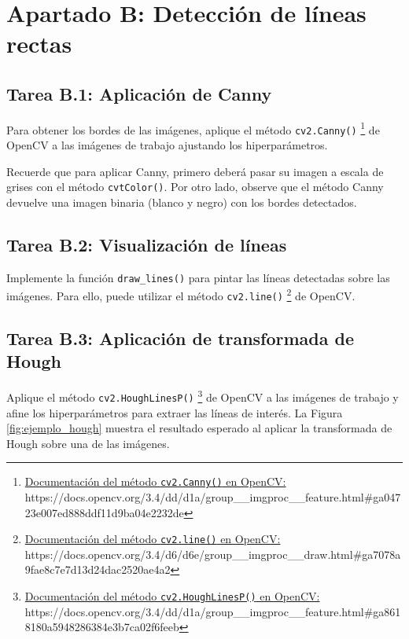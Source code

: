 \chapter{Apartado B: \textbf{Detección de líneas rectas}}
\label{chapter:tarea_b}

\section*{Tarea B.1: Aplicación de Canny}
{}

Para obtener los bordes de las imágenes, aplique el método \texttt{cv2.Canny()} \footnote{ \href{https://docs.opencv.org/3.4/dd/d1a/group\_\_imgproc\_\_feature.html\#ga04723e007ed888ddf11d9ba04e2232de}{Documentación del método \texttt{cv2.Canny()} en OpenCV:} \\{https://docs.opencv.org/3.4/dd/d1a/group\_\_imgproc\_\_feature.html\#ga04723e007ed888ddf11d9ba04e2232de}} de OpenCV a las imágenes de trabajo ajustando los hiperparámetros.

Recuerde que para aplicar Canny, primero deberá pasar su imagen a escala de grises con el método \texttt{cvtColor()}. Por otro lado, observe que el método Canny devuelve una imagen binaria (blanco y negro) con los bordes detectados.


\section*{Tarea B.2: Visualización de líneas}
{}

Implemente la función \texttt{draw\_lines()} para pintar las líneas detectadas sobre las imágenes. Para ello, puede utilizar el método \texttt{cv2.line()} \footnote{ \href{https://docs.opencv.org/3.4/d6/d6e/group\_\_imgproc\_\_draw.html\#ga7078a9fae8c7e7d13d24dac2520ae4a2}{Documentación del método \texttt{cv2.line()} en OpenCV:} \\{https://docs.opencv.org/3.4/d6/d6e/group\_\_imgproc\_\_draw.html\#ga7078a9fae8c7e7d13d24dac2520ae4a2}} de OpenCV.


\section*{Tarea B.3: Aplicación de transformada de Hough}
{} 
Aplique el método \texttt{cv2.HoughLinesP()} \footnote{ \href{https://docs.opencv.org/3.4/dd/d1a/group\_\_imgproc\_\_feature.html\#ga8618180a5948286384e3b7ca02f6feeb}{Documentación del método \texttt{cv2.HoughLinesP()} en OpenCV:} \\{https://docs.opencv.org/3.4/dd/d1a/group\_\_imgproc\_\_feature.html\#ga8618180a5948286384e3b7ca02f6feeb}} de OpenCV a las imágenes de trabajo y afine los hiperparámetros para extraer las líneas de interés. La Figura \ref{fig:ejemplo_hough} muestra el resultado esperado al aplicar la transformada de Hough sobre una de las imágenes.

